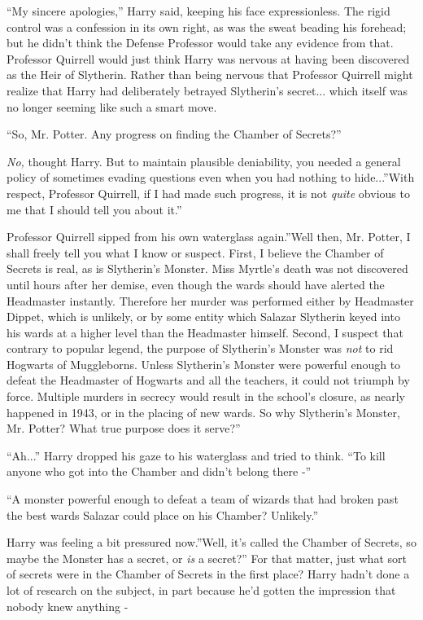 ``My sincere apologies,'' Harry said, keeping his face expressionless.
The rigid control was a confession in its own right, as was the sweat
beading his forehead; but he didn't think the Defense Professor would
take any evidence from that. Professor Quirrell would just think Harry
was nervous at having been discovered as the Heir of Slytherin. Rather
than being nervous that Professor Quirrell might realize that Harry had
deliberately betrayed Slytherin's secret... which itself was no
longer seeming like such a smart move.

``So, Mr. Potter. Any progress on finding the Chamber of Secrets?''

\emph{No,} thought Harry. But to maintain plausible deniability, you
needed a general policy of sometimes evading questions even when you had
nothing to hide...''With respect, Professor Quirrell, if I had made
such progress, it is not \emph{quite} obvious to me that I should tell
you about it.''

Professor Quirrell sipped from his own waterglass again.''Well then, Mr.
Potter, I shall freely tell you what I know or suspect. First, I believe
the Chamber of Secrets is real, as is Slytherin's Monster. Miss Myrtle's
death was not discovered until hours after her demise, even though the
wards should have alerted the Headmaster instantly. Therefore her murder
was performed either by Headmaster Dippet, which is unlikely, or by some
entity which Salazar Slytherin keyed into his wards at a higher level
than the Headmaster himself. Second, I suspect that contrary to popular
legend, the purpose of Slytherin's Monster was \emph{not} to rid
Hogwarts of Muggleborns. Unless Slytherin's Monster were powerful enough
to defeat the Headmaster of Hogwarts and all the teachers, it could not
triumph by force. Multiple murders in secrecy would result in the
school's closure, as nearly happened in 1943, or in the placing of new
wards. So why Slytherin's Monster, Mr. Potter? What true purpose does it
serve?''

``Ah...'' Harry dropped his gaze to his waterglass and tried to
think. ``To kill anyone who got into the Chamber and didn't belong there
-''

``A monster powerful enough to defeat a team of wizards that had broken
past the best wards Salazar could place on his Chamber? Unlikely.''

Harry was feeling a bit pressured now.''Well, it's called the Chamber of
Secrets, so maybe the Monster has a secret, or \emph{is} a secret?'' For
that matter, just what sort of secrets were in the Chamber of Secrets in
the first place? Harry hadn't done a lot of research on the subject, in
part because he'd gotten the impression that nobody knew anything -

